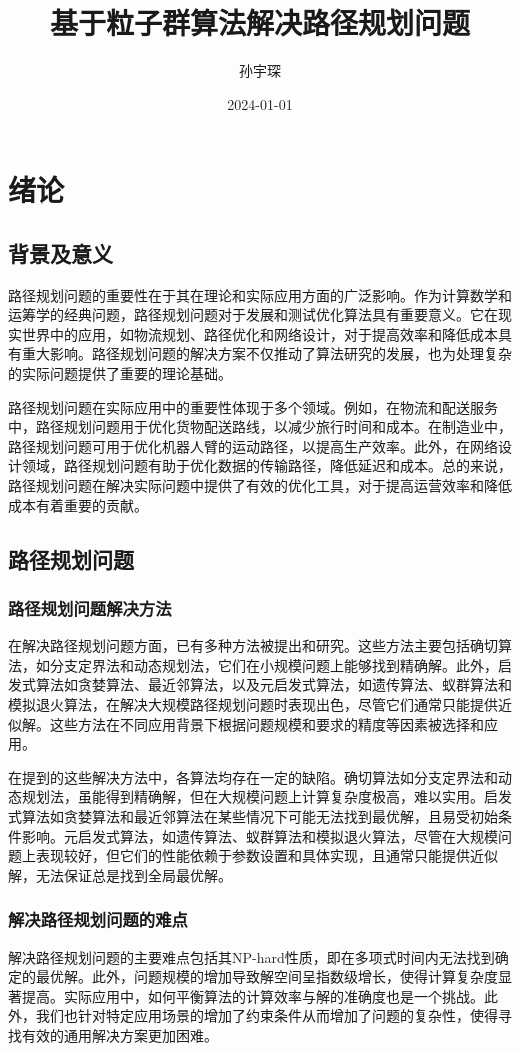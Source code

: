 \documentclass{ctexart}
\title{基于粒子群算法解决路径规划问题}
\author{孙宇琛}
\date{2024-01-01}
\begin{document}
\maketitle
\section{绪论}
\subsection{背景及意义}
路径规划问题的重要性在于其在理论和实际应用方面的广泛影响。作为计算数学和运筹学的经典问题，路径规划问题对于发展和测试优化算法具有重要意义。它在现实世界中的应用，如物流规划、路径优化和网络设计，对于提高效率和降低成本具有重大影响。路径规划问题的解决方案不仅推动了算法研究的发展，也为处理复杂的实际问题提供了重要的理论基础。

路径规划问题在实际应用中的重要性体现于多个领域。例如，在物流和配送服务中，路径规划问题用于优化货物配送路线，以减少旅行时间和成本。在制造业中，路径规划问题可用于优化机器人臂的运动路径，以提高生产效率。此外，在网络设计领域，路径规划问题有助于优化数据的传输路径，降低延迟和成本。总的来说，路径规划问题在解决实际问题中提供了有效的优化工具，对于提高运营效率和降低成本有着重要的贡献。
\subsection{路径规划问题}
\subsubsection{路径规划问题解决方法}
在解决路径规划问题方面，已有多种方法被提出和研究。这些方法主要包括确切算法，如分支定界法和动态规划法，它们在小规模问题上能够找到精确解。此外，启发式算法如贪婪算法、最近邻算法，以及元启发式算法，如遗传算法\cite{ref1}、蚁群算法\cite{ref2}\cite{ref3}和模拟退火算法\cite{ref4}，在解决大规模路径规划问题时表现出色，尽管它们通常只能提供近似解。这些方法在不同应用背景下根据问题规模和要求的精度等因素被选择和应用。

在提到的这些解决方法中，各算法均存在一定的缺陷。确切算法如分支定界法\cite{ref5}和动态规划法\cite{ref6}，虽能得到精确解，但在大规模问题上计算复杂度极高，难以实用。启发式算法如贪婪算法和最近邻算法在某些情况下可能无法找到最优解，且易受初始条件影响。元启发式算法，如遗传算法、蚁群算法和模拟退火算法，尽管在大规模问题上表现较好，但它们的性能依赖于参数设置和具体实现，且通常只能提供近似解，无法保证总是找到全局最优解。
\subsubsection{解决路径规划问题的难点}
解决路径规划问题的主要难点包括其NP-hard性质，即在多项式时间内无法找到确定的最优解\cite{ref7}。此外，问题规模的增加导致解空间呈指数级增长，使得计算复杂度显著提高。实际应用中，如何平衡算法的计算效率与解的准确度也是一个挑战。此外，我们也针对特定应用场景的增加了约束条件从而增加了问题的复杂性，使得寻找有效的通用解决方案更加困难。 
\end{document}

